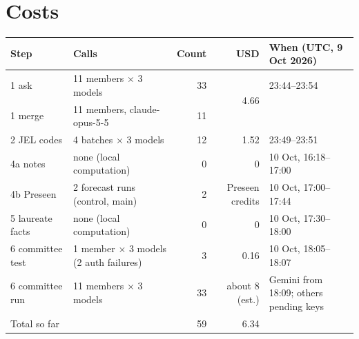\documentclass[11pt,a4paper]{article}
\begin{document}
\section{Costs}

\begin{center}
\small
\begin{tabular}{@{}llrrl@{}}
\toprule
Step & Calls & Count & USD & When (UTC, 9 Oct 2026) \\
\midrule
1 ask & 11 members $\times$ 3 models & 33 & \multirow{2}{*}{4.66} & 23:44--23:54 \\
1 merge & 11 members, claude-opus-5-5 & 11 & & \\
2 JEL codes & 4 batches $\times$ 3 models & 12 & 1.52 & 23:49--23:51 \\
4a notes & none (local computation) & 0 & 0 & 10 Oct, 16:18--17:00 \\
4b Preseen & 2 forecast runs (control, main) & 2 & Preseen credits & 10 Oct, 17:00--17:44 \\
5 laureate facts & none (local computation) & 0 & 0 & 10 Oct, 17:30--18:00 \\
6 committee test & 1 member $\times$ 3 models (2 auth failures) & 3 & 0.16 & 10 Oct, 18:05--18:07 \\
6 committee run & 11 members $\times$ 3 models & 33 & about 8 (est.) & Gemini from 18:09; others pending keys \\
\midrule
Total so far & & 59 & 6.34 & \\
\bottomrule
\end{tabular}
\end{center}
\end{document}

